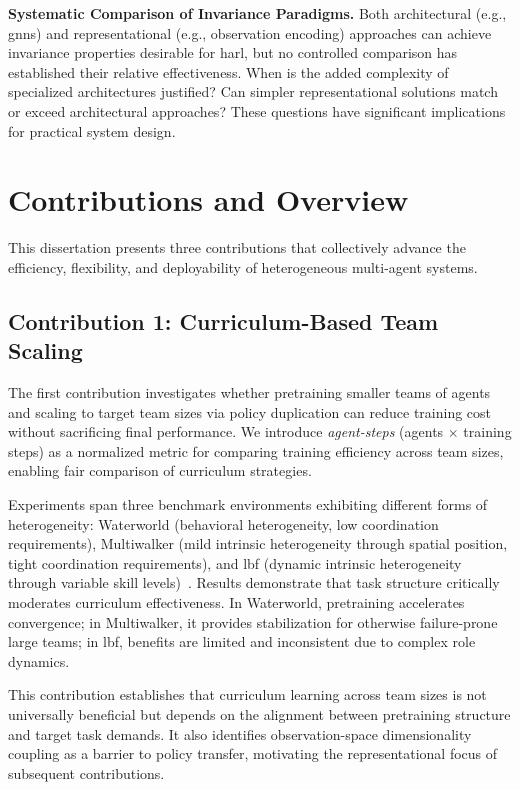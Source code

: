 \textbf{Systematic Comparison of Invariance Paradigms.} 
Both architectural (e.g., \glspl{gnn}) and representational 
(e.g., observation encoding) approaches can achieve invariance 
properties desirable for \gls{harl}, but no controlled comparison 
has established their relative effectiveness. When is the added 
complexity of specialized architectures justified? Can simpler 
representational solutions match or exceed architectural approaches? 
These questions have significant implications for practical system design.


\section{Contributions and Overview}%
\label{sec:intro_contributions}

This dissertation presents three contributions that collectively 
advance the efficiency, flexibility, and deployability of 
heterogeneous multi-agent systems.

\subsection{Contribution 1: Curriculum-Based Team Scaling}

The first contribution investigates whether pretraining 
smaller teams of agents and scaling to target team sizes 
via policy duplication can reduce training cost without 
sacrificing final performance. We introduce \emph{agent-steps} 
(agents $\times$ training steps) as a normalized metric for 
comparing training efficiency across team sizes, enabling 
fair comparison of curriculum strategies.

Experiments span three benchmark environments exhibiting 
different forms of heterogeneity: Waterworld 
(behavioral heterogeneity, low coordination requirements), 
Multiwalker (mild intrinsic heterogeneity through spatial position, 
tight coordination requirements), and 
\gls{lbf} (dynamic intrinsic heterogeneity through 
variable skill levels)~\cite{gupta2017,papoudakis2021}. 
Results demonstrate that task structure critically moderates 
curriculum effectiveness. In Waterworld, pretraining accelerates 
convergence; in Multiwalker, it provides stabilization for 
otherwise failure-prone large teams; in \gls{lbf}, benefits 
are limited and inconsistent due to complex role dynamics.

This contribution establishes that curriculum learning across 
team sizes is not universally beneficial but depends on the 
alignment between pretraining structure and target task demands. 
It also identifies observation-space dimensionality coupling as 
a barrier to policy transfer, motivating the representational 
focus of subsequent contributions.

